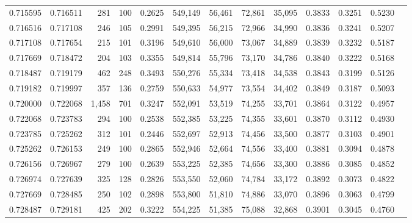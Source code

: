 \begin{tabular}{rrrrrrrrrrrrr}
0.715595 & 0.716511 &   281 & 100 &                                     0.2625 & 549,149 &  56,461 &  72,861 &  35,095 & 0.3833 & 0.3251 & 0.5230 \\
0.716516 & 0.717108 &   246 & 105 &                                     0.2991 & 549,395 &  56,215 &  72,966 &  34,990 & 0.3836 & 0.3241 & 0.5207 \\
0.717108 & 0.717654 &   215 & 101 &                                     0.3196 & 549,610 &  56,000 &  73,067 &  34,889 & 0.3839 & 0.3232 & 0.5187 \\
0.717669 & 0.718472 &   204 & 103 &                                     0.3355 & 549,814 &  55,796 &  73,170 &  34,786 & 0.3840 & 0.3222 & 0.5168 \\
0.718487 & 0.719179 &   462 & 248 &                                     0.3493 & 550,276 &  55,334 &  73,418 &  34,538 & 0.3843 & 0.3199 & 0.5126 \\
0.719182 & 0.719997 &   357 & 136 &                                     0.2759 & 550,633 &  54,977 &  73,554 &  34,402 & 0.3849 & 0.3187 & 0.5093 \\
0.720000 & 0.722068 & 1,458 & 701 &                                     0.3247 & 552,091 &  53,519 &  74,255 &  33,701 & 0.3864 & 0.3122 & 0.4957 \\
0.722068 & 0.723783 &   294 & 100 &                                     0.2538 & 552,385 &  53,225 &  74,355 &  33,601 & 0.3870 & 0.3112 & 0.4930 \\
0.723785 & 0.725262 &   312 & 101 &                                     0.2446 & 552,697 &  52,913 &  74,456 &  33,500 & 0.3877 & 0.3103 & 0.4901 \\
0.725262 & 0.726153 &   249 & 100 &                                     0.2865 & 552,946 &  52,664 &  74,556 &  33,400 & 0.3881 & 0.3094 & 0.4878 \\
0.726156 & 0.726967 &   279 & 100 &                                     0.2639 & 553,225 &  52,385 &  74,656 &  33,300 & 0.3886 & 0.3085 & 0.4852 \\
0.726974 & 0.727639 &   325 & 128 &                                     0.2826 & 553,550 &  52,060 &  74,784 &  33,172 & 0.3892 & 0.3073 & 0.4822 \\
0.727669 & 0.728485 &   250 & 102 &                                     0.2898 & 553,800 &  51,810 &  74,886 &  33,070 & 0.3896 & 0.3063 & 0.4799 \\
0.728487 & 0.729181 &   425 & 202 &                                     0.3222 & 554,225 &  51,385 &  75,088 &  32,868 & 0.3901 & 0.3045 & 0.4760 \\

\end{tabular}
